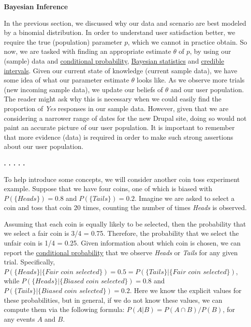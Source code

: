 
\textbf{Bayesian Inference}

In the previous section, we discussed why our data and scenario are best modeled by a binomial distribution. In order to understand user satisfaction better, we require the true (population) parameter $p$, which we cannot in practice obtain. So now, we are tasked with finding an appropriate estimate $\theta$ of $p$, by using our (sample) data and \href{https://en.wikipedia.org/wiki/Conditional_probability}{conditional probability}, \href{https://en.wikipedia.org/wiki/Bayesian_statistics}{Bayesian statistics} and \href{https://en.wikipedia.org/wiki/Credible_interval}{credible intervals}. Given our current state of knowledge (current sample data), we have some idea of what our parameter estimate $\theta$ looks like. As we observe more trials (new incoming sample data), we update our beliefs of $\theta$ and our user population. The reader might ask why this is necessary when we could easily find the proportion of \textit{Yes} responses in our sample data. However, given that we are considering a narrower range of dates for the new Drupal site, doing so would not paint an accurate picture of our user population. It is important to remember that more evidence (data) is required in order to make such strong assertions about our user population.

\textbf{. . . . .}

To help introduce some concepts, we will consider another coin toss experiment example. Suppose that we have four coins, one of which is biased with $P(\{\textit{Heads}\}) = 0.8$ and $P(\{\textit{Tails}\}) = 0.2$. Imagine we are asked to select a coin and toss that coin 20 times, counting the number of times \textit{Heads} is observed.

Assuming that each coin is equally likely to be selected, then the probability that we select a fair coin is 3/4 = 0.75. Therefore, the probability that we select the unfair coin is 1/4 = 0.25. Given information about which coin is chosen, we can report the \href{https://en.wikipedia.org/wiki/Conditional_probability}{conditional probability} that we observe \textit{Heads} or \textit{Tails} for any given trial. Specifically, $P(\{\textit{Heads}\} | \{\textit{Fair coin selected}\}) = 0.5 = P(\{\textit{Tails}\} | \{\textit{Fair coin selected}\})$, while $P(\{\textit{Heads}\} | \{\textit{Biased coin selected}\}) = 0.8$ and $P(\{\textit{Tails}\} | \{\textit{Biased coin selected}\}) = 0.2$. Here we know the explicit values for these probabilities, but in general, if we do not know these values, we can compute them via the following formula: $P(A | B) = P(A \cap B)/P(B)$, for any events $A$ and $B$. 

